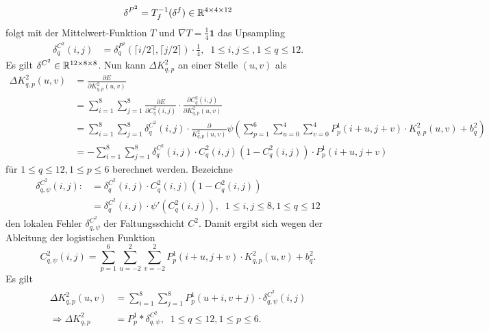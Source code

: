\begin{equation*}
    \delta^{P^2}=T_f^{-1}(\delta^f) \in \mathbb{R}^{4 \times 4 \times 12}
\end{equation*}
folgt mit der Mittelwert-Funktion $T$ und $\nabla T=\frac{1}{4} \mathbf{1}$ das Upsampling
\begin{align*}
    \delta^{C^2}_q(i,j)&= \delta^{P^2}_q\left( \lceil i/2 \rceil, \lceil j/2 \rceil\right) \cdot \frac{1}{4}, \; \; 1 \leq i,j \leq, 1 \leq q \leq 12.
\end{align*}
Es gilt $\delta^{C^2} \in \mathbb{R}^{12 \times 8 \times 8}$. Nun kann $\Delta K^2_{q,p}$ an einer Stelle $(u,v)$ als
\begin{align*}
    \Delta K^2_{q,p}(u,v) &=  \frac{\partial E}{\partial K^2_{q,p}(u,v)} \\
                          &=   \sum_{i=1}^8 \sum_{j=1}^8 \frac{\partial E}{\partial C^2_q(i,j)} \cdot \frac{\partial C^2_q(i,j)}{\partial K_{q,p}^2(u,v)} \\
                          &=  \sum_{i=1}^8 \sum_{j=1}^8 \delta_q^{C^2}(i,j) \cdot \frac{\partial}{ K^2_{q,p}(u,v)} \psi \left( \sum_{p=1}^6 \sum_{u=0}^4 \sum_{v=0}^4 P^1_p(i+u,j+v) \cdot K_{q,p}^2(u,v) +b_q^2\right) \\
                          &= - \sum_{i=1}^8 \sum_{j=1}^8 \delta_q^{C^2}(i,j) \cdot C_q^2(i,j)\left(1-C_q^2(i,j)\right) \cdot P^1_p(i+u,j+v)
\end{align*}
für $1 \leq q \leq 12, 1 \leq p \leq 6$ berechnet werden.
Bezeichne
\begin{align*}
    \delta^{C^2}_{q,\psi}(i,j):&= \delta^{C^2}_q(i,j) \cdot C_q^2(i,j)\left(1- C_q^2(i,j)\right)\\
    &= \delta^{C^2}_q(i,j) \cdot \psi'(C^2_q(i,j)), \; \; 1 \leq i,j \leq 8, 1 \leq q \leq 12
\end{align*} den lokalen Fehler $\delta^{C^2}_{q,\psi}$ der Faltungsschicht $C^2$. Damit ergibt sich wegen der Ableitung der logistischen Funktion
\begin{equation*}
    C_{q,\psi}^2(i,j)=\sum_{p=1}^6 \sum_{u=-2}^2 \sum_{v=-2}^2 P^1_p(i+u,j+v) \cdot K^2_{q,p}(u,v) +b_q^2.
\end{equation*}
Es gilt
\begin{align}
    \label{eq:conv_in_train}
    \begin{split}
    \Delta K^2_{q,p}(u,v) &=  \sum_{i=1}^8 \sum_{j=1}^8 P^1_{p}(u+i,v+j) \cdot \delta^{C^2}_{q,\psi}(i,j) \\
     \Rightarrow \Delta K_{q,p}^2 &=  P^1_{p} \ast \delta^{C^2}_{q,\psi} , \; \; 1 \leq q \leq 12, 1 \leq p \leq 6.
    \end{split}
\end{align}
